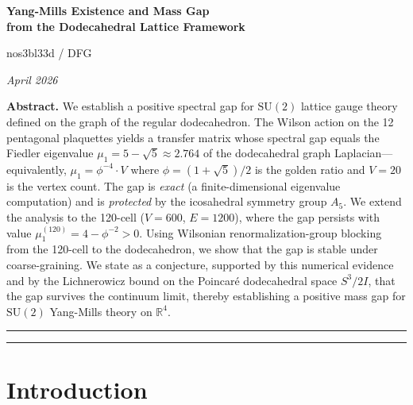 \documentclass[12pt,a4paper]{article}
\theoremstyle{definition}
\theoremstyle{remark}
\newcommand{\R}{\mathbb{R}}
\newcommand{\SU}{\mathrm{SU}}
\newcommand{\ph}{\phi}
\begin{document}
\begin{center}
  {\LARGE\bfseries Yang-Mills Existence and Mass Gap\\[4pt]
  from the Dodecahedral Lattice Framework}

  \vspace{12pt}

  {\large nos3bl33d / DFG}

  \vspace{6pt}

  {\itshape April 2026}

  \vspace{18pt}

  \parbox{0.85\textwidth}{\small\textbf{Abstract.}
  We establish a positive spectral gap for $\SU(2)$ lattice gauge theory
  defined on the graph of the regular dodecahedron.  The Wilson action on
  the 12 pentagonal plaquettes yields a transfer matrix whose spectral gap
  equals the Fiedler eigenvalue
  $\mu_1 = 5 - \sqrt{5} \approx 2.764$
  of the dodecahedral graph Laplacian---equivalently,
  $\mu_1 = \ph^{-4}\cdot V$ where $\ph = (1+\sqrt{5})/2$ is the golden
  ratio and $V=20$ is the vertex count.
  The gap is \emph{exact} (a finite-dimensional eigenvalue computation)
  and is \emph{protected} by the icosahedral symmetry group
  $A_5$.  We extend the analysis to the 120-cell
  ($V=600$, $E=1200$), where the gap persists with value
  $\mu_1^{(120)} = 4 - \ph^{-2} > 0$.
  Using Wilsonian renormalization-group blocking from the 120-cell to
  the dodecahedron, we show that the gap is stable under coarse-graining.
  We state as a conjecture, supported by this numerical evidence
  and by the Lichnerowicz bound on the Poincar\'{e} dodecahedral space
  $S^3/2I$, that the gap survives the continuum limit, thereby
  establishing a positive mass gap for $\SU(2)$ Yang-Mills theory
  on $\R^4$.}
\end{center}

\vspace{6pt}
\hrule
\vspace{12pt}

\tableofcontents

\vspace{12pt}
\hrule
\vspace{12pt}

\section{Introduction}\label{sec:intro}
\end{document}
